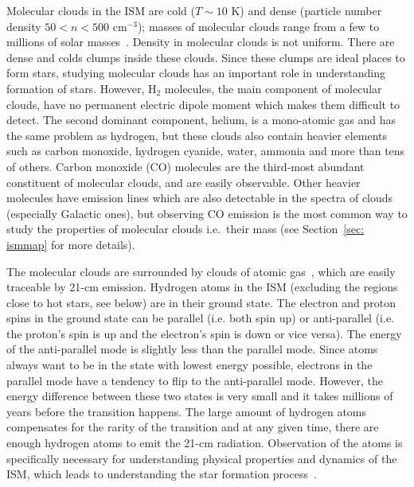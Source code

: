 Molecular clouds in the ISM are cold ($T \sim10$ K) and dense (particle number density $ 50<n<500$ cm$^{-3}$); masses of molecular clouds range from a few to millions of solar masses~\citep{Bolato08}.
Density in molecular clouds is not uniform. There are dense and colds clumps inside these clouds.
Since these clumps are ideal places to form stars, studying molecular clouds has an important role in understanding formation of stars.
However, H$_2$ molecules, the main component of molecular clouds, have no permanent electric dipole moment which makes them difficult to detect.
The second dominant component, helium, is a mono-atomic gas and has the same problem as hydrogen, but these clouds also contain heavier elements such as carbon monoxide, hydrogen cyanide, water, ammonia and more than tens of others.
Carbon monoxide (CO) molecules are the third-most abundant constituent of molecular clouds, and are easily observable.
Other heavier molecules have emission lines which are also detectable in the spectra of clouds (especially Galactic ones), but observing CO emission is the most common way to study the properties of molecular clouds i.e.\ their mass (see Section~\ref{sec: ismmap} for more details).

The molecular clouds are surrounded by clouds of atomic gas~\citep{Kennicutt12}, which are easily traceable by 21-cm emission.
Hydrogen atoms in the ISM (excluding the regions close to hot stars, see below) are in their ground state. 
The electron and proton spins in the ground state can be parallel (i.e. both spin up) or anti-parallel (i.e. the proton's spin is up and the electron's spin is down or vice versa). 
The energy of the anti-parallel mode is slightly less than the parallel mode.
Since atoms always want to be in the state with lowest energy possible, electrons in the parallel mode have a tendency to flip to the anti-parallel mode. 
However, the energy difference between these two states is very small and it takes millions of years before the transition happens.
The large amount of hydrogen atoms compensates for the rarity of the transition and at any given time, there are enough hydrogen atoms to emit the 21-cm radiation. 
Observation of the \hi atoms is specifically necessary for understanding physical properties and dynamics of the ISM, which leads to understanding the star formation process~\citep{Walter08}.

